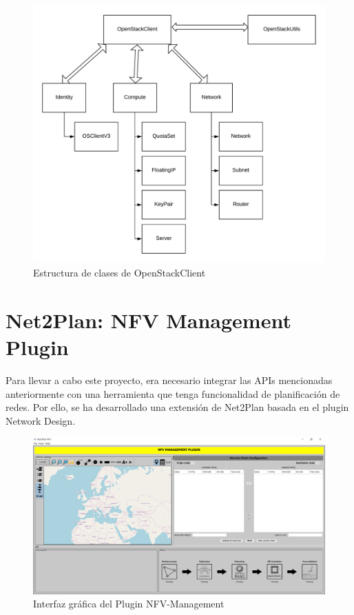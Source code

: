\begin{figure}[!ht]
	\centering
	\includegraphics[width=0.8\linewidth]{imagenes/OpenStackClient}
	\caption{Estructura de clases de OpenStackClient}
	\label{fig:openstackclient}
\end{figure}

\section{Net2Plan: NFV Management Plugin}
\label{sec:nfvplugin}

Para llevar a cabo este proyecto, era necesario integrar las APIs mencionadas anteriormente con una herramienta que tenga funcionalidad de planificación de redes. Por ello, se ha desarrollado una extensión de Net2Plan basada en el plugin Network Design.


\begin{figure}[!ht]
	\centering
	\includegraphics[width=0.8\linewidth]{imagenes/nfvplugin_dashboard}
	\caption{Interfaz gráfica del Plugin NFV-Management}
	\label{fig:nfvplugindash}
\end{figure}

